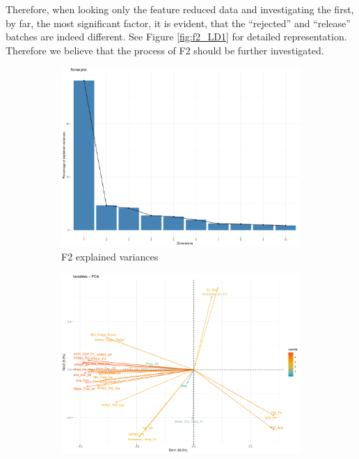 Therefore, when looking only the feature reduced data and investigating the first, by far, the most significant factor, it is evident, that the ``rejected'' and ``release'' batches are indeed different. See Figure \ref{fig:f2_LD1} for detailed representation. Therefore we believe that the process of F2 should be further investigated.

\begin{figure}
    \begin{subfigure}{0.3\textwidth}
        \begin{center}
        \includegraphics[width=\textwidth]{plots/f2_explained_variances.pdf}        
        \end{center}
        \caption{F2 explained variances}
        \label{fig:f2_explained_variances}
    \end{subfigure}%
    \begin{subfigure}{0.3\textwidth}
        \begin{center}
        \includegraphics[width=\textwidth]{plots/f2_graph_of_variables.pdf}

\end{center}
\end{subfigure}
\end{figure}
